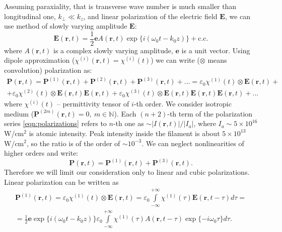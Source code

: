 \documentclass[a4paper, 12pt]{article}
\begin{document}
Assuming paraxiality, that is transverse wave number is much smaller than longitudinal one, $k_\perp \ll k_z$, and linear polarization of the electric field $\mathbf{E}$, we can use method of slowly varying amplitude $\mathbf{E}$:
\begin{equation}
\mathbf{E}(\mathbf{r}, t) = \frac1{2}\mathbf{e} A(\mathbf{r}, t) \exp\{i (\omega_0 t - k_0 z)\} + \text{c.c.}
\end{equation}
where $A(\mathbf{r}, t)$ is a complex slowly varying amplitude, $\mathbf{e}$ is a unit vector.
Using dipole approximation ($\chi^{(i)}(\mathbf{r},t) = \chi^{(i)}(t)$) we can write ($\otimes$ means convolution) polarization as:
\begin{multline}
\label{eqn:polarizations}
\mathbf{P}(\mathbf{r}, t) = \mathbf{P}^{(1)}(\mathbf{r}, t) + \mathbf{P}^{(2)}(\mathbf{r}, t) + \mathbf{P}^{(3)}(\mathbf{r}, t) + ... = \varepsilon_0 \chi^{(1)}(t) \otimes \mathbf{E}(\mathbf{r}, t) +\\+ \varepsilon_0  \chi^{(2)}(t) \otimes \mathbf{E}(\mathbf{r}, t) \mathbf{E}(\mathbf{r}, t) + \varepsilon_0  \chi^{(3)}(t) \otimes \mathbf{E}(\mathbf{r}, t) \mathbf{E}(\mathbf{r}, t) \mathbf{E}(\mathbf{r}, t) + ...
\end{multline}
where $\chi^{(i)}(t)$ -- permittivity tensor of $i$-th order. We consider isotropic medium ($\mathbf{P}^{(2 m)}(\mathbf{r}, t)=0, \ m \in \mathbb{N}$). Each $(n+2)$-th term of the polarization series \eqref{eqn:polarizations} refers to $n$-th one as $\sim \bigl|I(\mathbf{r}, t) \bigr| \bigl/ \bigl|I_a \bigr|$, where $I_a \sim 5 \times 10^{16}$ W/cm$^2$ is atomic intensity. Peak intensity inside the filament is about $5 \times 10^{13}$ W/cm$^2$, so the ratio is of the order of $\sim 10^{-3}$. We can neglect nonlinearities of higher orders and write:
\begin{equation}
\mathbf{P}(\mathbf{r}, t) = \mathbf{P}^{(1)}(\mathbf{r}, t) + \mathbf{P}^{(3)}(\mathbf{r}, t).
\end{equation}
Therefore we will limit our consideration only to linear and cubic polarizations. Linear polarization can be written as
\begin{multline}
\mathbf{P}^{(1)}(\mathbf{r}, t) = \varepsilon_0 \chi^{(1)}(t) \otimes \mathbf{E}(\mathbf{r}, t) =
\varepsilon_0 \int\limits_{-\infty}^{+\infty} \chi^{(1)}(\tau) \mathbf{E}(\mathbf{r}, t - \tau) d\tau =\\= \frac1{2}\mathbf{e} \exp\{i (\omega_0 t  - k_0 z)\} \varepsilon_0 \int\limits_{-\infty}^{+\infty} \chi^{(1)}(\tau)  A(\mathbf{r}, t - \tau) \exp\{-i \omega_0 \tau \} d\tau.
\end{multline}
\end{document}
